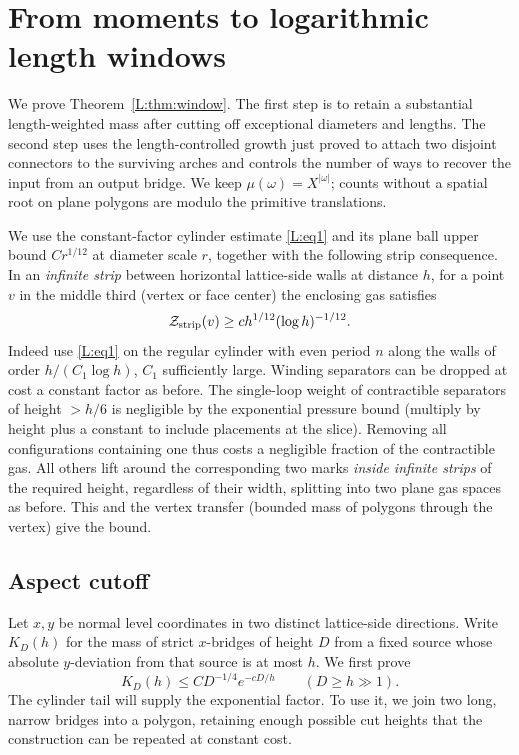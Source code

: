 \documentclass[11pt]{article}
\numberwithin{equation}{section}
\theoremstyle{definition}\newtheorem{definition}[theorem]{Definition}
\theoremstyle{remark}\newtheorem{remark}[theorem]{Remark}
\begin{document}
\section{From moments to logarithmic length windows}\label{L:part11}

We prove Theorem~\ref{L:thm:window}. The first step is to retain a substantial length-weighted mass after cutting off exceptional diameters and lengths. The second step uses the length-controlled growth just proved to attach two disjoint connectors to the surviving arches and controls the number of ways to recover the input from an output bridge. We keep \(\mu(\omega)=X^{|\omega|}\); counts without a spatial root on plane polygons are modulo the primitive translations.

We use the constant-factor cylinder estimate \eqref{L:eq1} and its plane ball upper bound \(C r^{1/12}\) at diameter scale \(r\), together with the following strip consequence. In an \emph{infinite strip} between horizontal lattice-side walls at distance \(h\), for a point \(v\) in the middle third (vertex or face center) the enclosing gas satisfies
\[
 {\cal Z}_{\rm strip}(v)\ge c h^{1/12}(\log h)^{-1/12}.
\]
Indeed use \eqref{L:eq1} on the regular cylinder with even period \(n\) along the walls of order \(h/(C_1\log h)\), \(C_1\) sufficiently large. Winding separators can be dropped at cost a constant factor as before. The single-loop weight of contractible separators of height \(>h/6\) is negligible by the exponential pressure bound (multiply by height plus a constant to include placements at the slice). Removing all configurations containing one thus costs a negligible fraction of the contractible gas. All others lift around the corresponding two marks \emph{inside infinite strips} of the required height, regardless of their width, splitting into two plane gas spaces as before. This and the vertex transfer (bounded mass of polygons through the vertex) give the bound.

\subsection{Aspect cutoff}\label{L:step18}\label{L:prop:aspect}

Let $x,y$ be normal level coordinates in two distinct lattice-side
 directions.  Write $K_D(h)$ for the mass of strict $x$-bridges of height
$D$ from a fixed source whose absolute $y$-deviation from that source is
at most $h$.  We first prove
\begin{equation}\label{L:eq:aspect-bound}
 K_D(h)\le C D^{-1/4}e^{-cD/h}\qquad(D\ge h\gg1).
\end{equation}
The cylinder tail will supply the exponential factor.  To use it, we
join two long, narrow bridges into a polygon, retaining enough possible
cut heights that the construction can be repeated at constant cost.
\end{document}
